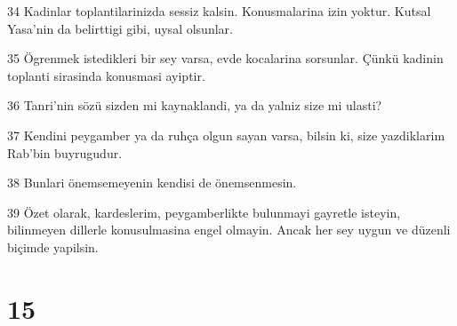 \par 34 Kadinlar toplantilarinizda sessiz kalsin. Konusmalarina izin yoktur. Kutsal Yasa'nin da belirttigi gibi, uysal olsunlar.
\par 35 Ögrenmek istedikleri bir sey varsa, evde kocalarina sorsunlar. Çünkü kadinin toplanti sirasinda konusmasi ayiptir.
\par 36 Tanri'nin sözü sizden mi kaynaklandi, ya da yalniz size mi ulasti?
\par 37 Kendini peygamber ya da ruhça olgun sayan varsa, bilsin ki, size yazdiklarim Rab'bin buyrugudur.
\par 38 Bunlari önemsemeyenin kendisi de önemsenmesin.
\par 39 Özet olarak, kardeslerim, peygamberlikte bulunmayi gayretle isteyin, bilinmeyen dillerle konusulmasina engel olmayin. Ancak her sey uygun ve düzenli biçimde yapilsin.

\chapter{15}

